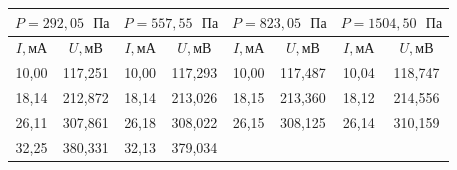 \documentclass[a4paper,12pt]{article}
\begin{document}
\begin{table}[H]\label{tab:p_malenkiye}
    \centering
    \begin{tabular}{|cc|cc|cc|cc|}
        \hline
        \multicolumn{2}{|c|}{{\color[HTML]{000000} $P = 292,05 \text{ }Па$}} &
          \multicolumn{2}{c|}{{\color[HTML]{000000} $P = 557,55 \text{ }Па$}} &
          \multicolumn{2}{c|}{{\color[HTML]{000000} $P = 823,05 \text{ }Па$}} &
          \multicolumn{2}{c|}{{\color[HTML]{000000} $P = 1504,50 \text{ }Па$}} \\ \hline
        \multicolumn{1}{|c|}{{\color[HTML]{000000} $I, мА$}} &
          {\color[HTML]{000000} $U, мВ$} &
          \multicolumn{1}{c|}{{\color[HTML]{000000} $I, мА$}} &
          {\color[HTML]{000000} $U, мВ$} &
          \multicolumn{1}{c|}{{\color[HTML]{000000} $I, мА$}} &
          {\color[HTML]{000000} $U, мВ$} &
          \multicolumn{1}{c|}{{\color[HTML]{000000} $I, мА$}} &
          {\color[HTML]{000000} $U, мВ$} \\ \hline
        \multicolumn{1}{|c|}{{\color[HTML]{000000} 10,00}} &
          {\color[HTML]{000000} 117,251} &
          \multicolumn{1}{c|}{{\color[HTML]{000000} 10,00}} &
          {\color[HTML]{000000} 117,293} &
          \multicolumn{1}{c|}{{\color[HTML]{000000} 10,00}} &
          {\color[HTML]{000000} 117,487} &
          \multicolumn{1}{c|}{{\color[HTML]{000000} 10,04}} &
          {\color[HTML]{000000} 118,747} \\ \hline
        \multicolumn{1}{|c|}{{\color[HTML]{000000} 18,14}} &
          {\color[HTML]{000000} 212,872} &
          \multicolumn{1}{c|}{{\color[HTML]{000000} 18,14}} &
          {\color[HTML]{000000} 213,026} &
          \multicolumn{1}{c|}{{\color[HTML]{000000} 18,15}} &
          {\color[HTML]{000000} 213,360} &
          \multicolumn{1}{c|}{{\color[HTML]{000000} 18,12}} &
          {\color[HTML]{000000} 214,556} \\ \hline
        \multicolumn{1}{|c|}{{\color[HTML]{000000} 26,11}} &
          {\color[HTML]{000000} 307,861} &
          \multicolumn{1}{c|}{{\color[HTML]{000000} 26,18}} &
          {\color[HTML]{000000} 308,022} &
          \multicolumn{1}{c|}{{\color[HTML]{000000} 26,15}} &
          {\color[HTML]{000000} 308,125} &
          \multicolumn{1}{c|}{{\color[HTML]{000000} 26,14}} &
          {\color[HTML]{000000} 310,159} \\ \hline
        \multicolumn{1}{|c|}{{\color[HTML]{000000} 32,25}} &
          {\color[HTML]{000000} 380,331} &
          \multicolumn{1}{c|}{{\color[HTML]{000000} 32,13}} &
          {\color[HTML]{000000} 379,034} &

\end{tabular}
\end{table}
\end{document}
